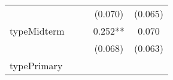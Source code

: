 \documentclass[12pt,twoside]{reedthesis}
\begin{document}
\begin{longtable}[]{@{}lcccc@{}}
\begin{minipage}[t]{0.26\columnwidth}
  \strut
  \end{minipage} & \begin{minipage}[t]{0.12\columnwidth}\centering\strut
  \strut
  \end{minipage} & \begin{minipage}[t]{0.13\columnwidth}\centering\strut
  \strut
  \end{minipage} & \begin{minipage}[t]{0.14\columnwidth}\centering\strut
  (0.070)\strut
  \end{minipage} & \begin{minipage}[t]{0.14\columnwidth}\centering\strut
  (0.065)\strut
  \end{minipage}\tabularnewline
  \begin{minipage}[t]{0.26\columnwidth}\raggedright\strut
  typeMidterm\strut
  \end{minipage} & \begin{minipage}[t]{0.12\columnwidth}\centering\strut
  \strut
  \end{minipage} & \begin{minipage}[t]{0.13\columnwidth}\centering\strut
  \strut
  \end{minipage} & \begin{minipage}[t]{0.14\columnwidth}\centering\strut
  0.252**\strut
  \end{minipage} & \begin{minipage}[t]{0.14\columnwidth}\centering\strut
  0.070\strut
  \end{minipage}\tabularnewline
  \begin{minipage}[t]{0.26\columnwidth}\raggedright\strut
  \strut
  \end{minipage} & \begin{minipage}[t]{0.12\columnwidth}\centering\strut
  \strut
  \end{minipage} & \begin{minipage}[t]{0.13\columnwidth}\centering\strut
  \strut
  \end{minipage} & \begin{minipage}[t]{0.14\columnwidth}\centering\strut
  (0.068)\strut
  \end{minipage} & \begin{minipage}[t]{0.14\columnwidth}\centering\strut
  (0.063)\strut
  \end{minipage}\tabularnewline
  \begin{minipage}[t]{0.26\columnwidth}\raggedright\strut
  typePrimary\strut
  \end{minipage} & \begin{minipage}[t]{0.12\columnwidth}\centering\strut

\end{minipage}
\end{longtable}
\end{document}
